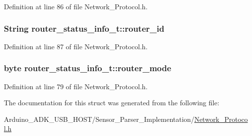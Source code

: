 Definition at line 86 of file Network\-\_\-\-Protocol.\-h.

\hypertarget{structrouter__status__info__t_a95a30107734e8164920ce85290e40483}{
\subsubsection[{router\-\_\-id}]{\setlength{\rightskip}{0pt plus 5cm}String router\-\_\-status\-\_\-info\-\_\-t\-::router\-\_\-id}}\label{structrouter__status__info__t_a95a30107734e8164920ce85290e40483}


Definition at line 87 of file Network\-\_\-\-Protocol.\-h.

\hypertarget{structrouter__status__info__t_a75039a32112b2b3380b93066999feb89}{
\subsubsection[{router\-\_\-mode}]{\setlength{\rightskip}{0pt plus 5cm}byte router\-\_\-status\-\_\-info\-\_\-t\-::router\-\_\-mode}}\label{structrouter__status__info__t_a75039a32112b2b3380b93066999feb89}


Definition at line 79 of file Network\-\_\-\-Protocol.\-h.



The documentation for this struct was generated from the following file\-:\begin{DoxyCompactItemize}
\item 
Arduino\-\_\-\-A\-D\-K\-\_\-\-U\-S\-B\-\_\-\-H\-O\-S\-T/\-Sensor\-\_\-\-Parser\-\_\-\-Implementation/\hyperlink{_network___protocol_8h}{Network\-\_\-\-Protocol.\-h}\end{DoxyCompactItemize}
